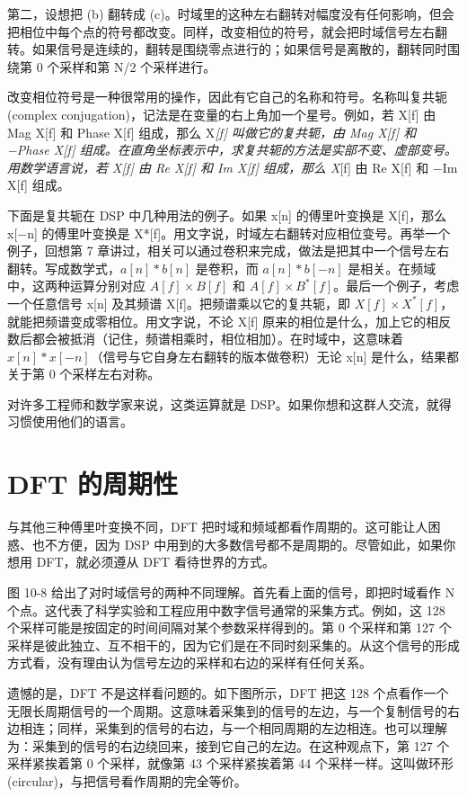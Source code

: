 第二，设想把 (b) 翻转成
(c)。时域里的这种左右翻转对幅度没有任何影响，但会把相位中每个点的符号都改变。同样，改变相位的符号，就会把时域信号左右翻转。如果信号是连续的，翻转是围绕零点进行的；如果信号是离散的，翻转同时围绕第
0 个采样和第 N/2 个采样进行。

改变相位符号是一种很常用的操作，因此有它自己的名称和符号。名称叫复共轭(complex
conjugation)，记法是在变量的右上角加一个星号。例如，若 X{[}f{]} 由 Mag
X{[}f{]} 和 Phase X{[}f{]} 组成，那么 X\emph{{[}f{]} 叫做它的复共轭，由
Mag X{[}f{]} 和 −Phase X{[}f{]}
组成。在直角坐标表示中，求复共轭的方法是实部不变、虚部变号。用数学语言说，若
X{[}f{]} 由 Re X{[}f{]} 和 Im X{[}f{]} 组成，那么 X}{[}f{]} 由 Re
X{[}f{]} 和 −Im X{[}f{]} 组成。

下面是复共轭在 DSP 中几种用法的例子。如果 x{[}n{]} 的傅里叶变换是
X{[}f{]}，那么 x{[}−n{]} 的傅里叶变换是
X*{[}f{]}。用文字说，时域左右翻转对应相位变号。再举一个例子，回想第 7
章讲过，相关可以通过卷积来完成，做法是把其中一个信号左右翻转。写成数学式，\(a[n] * b[n]\)
是卷积，而 \(a[n] * b[-n]\) 是相关。在频域中，这两种运算分别对应
\(A[f] \times B[f]\) 和
\(A[f] \times B^*[f]\)。最后一个例子，考虑一个任意信号 x{[}n{]} 及其频谱
X{[}f{]}。把频谱乘以它的复共轭，即
\(X[f] \times X^*[f]\)，就能把频谱变成零相位。用文字说，不论 X{[}f{]}
原来的相位是什么，加上它的相反数后都会被抵消（记住，频谱相乘时，相位相加）。在时域中，这意味着
\(x[n] * x[-n]\)（信号与它自身左右翻转的版本做卷积）无论 x{[}n{]}
是什么，结果都关于第 0 个采样左右对称。

对许多工程师和数学家来说，这类运算就是
DSP。如果你想和这群人交流，就得习惯使用他们的语言。

\section{DFT 的周期性}

与其他三种傅里叶变换不同，DFT
把时域和频域都看作周期的。这可能让人困惑、也不方便，因为 DSP
中用到的大多数信号都不是周期的。尽管如此，如果你想用 DFT，就必须遵从 DFT
看待世界的方式。

图 10-8 给出了对时域信号的两种不同理解。首先看上面的信号，即把时域看作 N
个点。这代表了科学实验和工程应用中数字信号通常的采集方式。例如，这 128
个采样可能是按固定的时间间隔对某个参数采样得到的。第 0 个采样和第 127
个采样是彼此独立、互不相干的，因为它们是在不同时刻采集的。从这个信号的形成方式看，没有理由认为信号左边的采样和右边的采样有任何关系。

遗憾的是，DFT 不是这样看问题的。如下图所示，DFT 把这 128
个点看作一个无限长周期信号的一个周期。这意味着采集到的信号的左边，与一个复制信号的右边相连；同样，采集到的信号的右边，与一个相同周期的左边相连。也可以理解为：采集到的信号的右边绕回来，接到它自己的左边。在这种观点下，第
127 个采样紧挨着第 0 个采样，就像第 43 个采样紧挨着第 44
个采样一样。这叫做环形(circular)，与把信号看作周期的完全等价。

